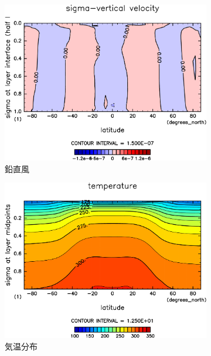 \documentclass[body]{subfiles}
\begin{document}
\begin{figure}[t]
\begin{subfigure}{.4\textwidth}
		\includegraphics[width=\columnwidth]{S1800/SigDot,time=3650:4015-crop-rotate.pdf}
		\caption{鉛直風}\label{S1800鉛直風}
	\end{subfigure}
	\begin{subfigure}{.4\textwidth}
		\centering
		\includegraphics[width=\columnwidth]{S1800/Temp,time=3650:4015-crop-rotate.pdf}
		\caption{気温分布}\label{S1800気温分布}
	\end{subfigure}
	\begin{subfigure}{.4\textwidth}
		\centering

\end{subfigure}
\end{figure}
\end{document}

